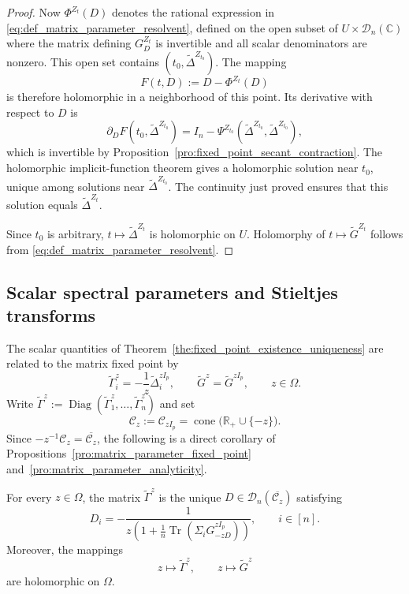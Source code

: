 \documentclass[EJP, preprint, NODS, nobera, nofontexpansion]{ejpecp}
\DeclareMathOperator{\tr}{Tr}
\DeclareMathOperator{\diag}{Diag}
\DeclareMathOperator{\cone}{cone}
\begin{document}
\begin{proof}
Now \(\Phi^{Z_t}(D)\) denotes the rational
expression in \eqref{eq:def_matrix_parameter_resolvent}, defined on the
open subset of \(U\times\mathcal D_n(\mathbb C)\) where the matrix defining
\(G_D^{Z_t}\) is invertible and all scalar denominators are nonzero.
This open set contains \((t_0,\widetilde\Delta^{Z_{t_0}})\). The mapping
\[
    F(t,D):=D-\Phi^{Z_t}(D)
\]
is therefore holomorphic in a neighborhood of this point.
Its derivative with respect to \(D\) is
\[
    \partial_DF(t_0,\widetilde\Delta^{Z_{t_0}})
    =
    I_n-\Psi^{Z_{t_0}}\!\left(
        \widetilde\Delta^{Z_{t_0}},
        \widetilde\Delta^{Z_{t_0}}
    \right),
\]
which is invertible by
Proposition~\ref{pro:fixed_point_secant_contraction}.
The holomorphic implicit-function theorem gives a holomorphic solution
near \(t_0\), unique among solutions near
\(\widetilde\Delta^{Z_{t_0}}\).
The continuity just proved ensures that this solution equals
\(\widetilde\Delta^{Z_t}\).

Since \(t_0\) is arbitrary,
\(t\mapsto\widetilde\Delta^{Z_t}\) is holomorphic on \(U\).
Holomorphy of \(t\mapsto\widetilde G^{Z_t}\) follows from
\eqref{eq:def_matrix_parameter_resolvent}.
\end{proof}

\subsection{Scalar spectral parameters and Stieltjes transforms}

The scalar quantities of Theorem~\ref{the:fixed_point_existence_uniqueness}
are related to the matrix fixed point by
\[
    \tilde\Gamma_i^z=-\frac1z\widetilde\Delta_i^{zI_p},
    \qquad
    \tilde G^z=\widetilde G^{zI_p},\qquad z\in\Omega.
\]
Write $\tilde\Gamma^z:=\diag(\tilde\Gamma_1^z,\ldots,\tilde\Gamma_n^z)$
and set
\[
    \mathcal C_z:=\mathcal C_{zI_p}
    =\cone\bigl(\mathbb R_+\cup\{-z\}\bigr).
\]
Since $-z^{-1}\mathcal C_z=\overline{\mathcal C_z}$, the following is a
direct corollary of Propositions~\ref{pro:matrix_parameter_fixed_point}
and~\ref{pro:matrix_parameter_analyticity}.

\begin{corollary}
\label{cor:tilde_Gamma_analytic}
For every $z\in\Omega$, the matrix $\tilde\Gamma^z$ is the unique
$D\in\mathcal D_n(\overline{\mathcal C_z})$ satisfying
\[
 D_i=-\frac1{
  z\left(1+\frac1n\tr(\Sigma_iG_{-zD}^{zI_p})\right)
 },\qquad i\in[n].
\]
Moreover, the mappings
\[
    z\longmapsto\tilde\Gamma^z,
    \qquad
    z\longmapsto\tilde G^z
\]
are holomorphic on \(\Omega\).
\end{corollary}
\end{document}
